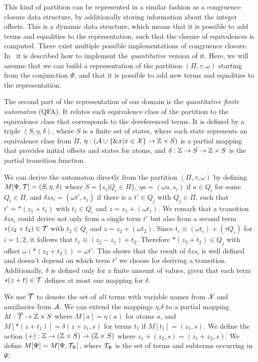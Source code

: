 This kind of partition can be represented in a similar fashion as a congruence closure data structure\cite{abstract-cc}, by additionally storing information about the integer offsets.
This is a dynamic data structure, which means that it is possible to add terms and equalities to the representation, such that the closure of equivalences is computed.
There exist multiple possible implementations of congruence closure\cite{cc-nelson, cc-shostak, cc-tarjan}.
In~\cite{2pointer} it is described how to implement the \emph{quantitative} version of it.
Here, we will assume that we can build a representation of the partition $(\Pi, \tau, \omega)$ starting from the conjunction $\Psi$, and that it is possible to add new terms and equalities to the representation.

The second part of the representation of our domain is the \emph{quantitative finite automaton} (QFA). It relates each equivalence class of the partition to the equivalence class that corresponds to the dereferenced terms.
It is defined by a triple $(S, \eta, \delta)$, where $S$ is a finite set of states, where each state represents an equivalence class from $\Pi$, $\eta : (\mathcal{A} \cup \{\&x | x \in \mathcal{X}\} \rightarrow \mathbb{Z} \times S)$ is a partial mapping that provides initial offsets and states for atoms, and $\delta : \mathbb{Z} \rightarrow S \rightarrow \mathbb{Z} \times S$ is the partial transition function.

We can derive the automaton directly from the partition $(\Pi, \tau, \omega)$ by defining $M[\Psi,\mathcal{T}] = (S, \eta, \delta)$ where $S = \{s_i | Q_i \in \Pi\}$, $\eta a = (\omega a, s_i)$ if $a \in Q_i$ for some $Q_i \in \Pi$, and $\delta z s_i = (\omega t', s_j)$ if there is a $t' \in Q_j$ with $Q_j \in \Pi$, such that $t' = *(z_1 + t_1)$ with $t_1 \in Q_i$ and $z = z_1 + (\omega t_1)$.
We remark that a transition $\delta z s_i$ could derive not only from a single term $t'$ but also from a second term $*(z_2 + t_2) \in \mathcal{T}$ with $t_2 \in Q_i$ and $z = z_2 + (\omega t_2)$.
Since $t_i \equiv (\omega t_i) + (\tau Q_i)$ for $i = 1,2$, it follows that $t_1 \equiv (z_2 - z_1)+ t_2$. Therefore $*(z_2+t_2)\in Q_j$ with offset $\omega(*(z_2+t_2)) = \omega t'$.
This shows that the result of $\delta z s_i$ is well defined and doesn't depend on which term $t'$ we choose for deriving a transition.
Additionally, $\delta$ is defined only for a finite amount of values, given that each term $*(z + t) \in \mathcal{T}$ defines at most one mapping for $\delta$.

We use ${\overline{\mathcal{T}}}$ to denote the set of \emph{all} terms with variable names from $\mathcal{X}$ and auxiliaries from $\mathcal{A}$.
We can extend the mappings $\eta$,$\delta$ to a partial mapping $M : {\overline{\mathcal{T}}} \rightarrow \mathbb{Z} \times S$ where $M[a] = \eta(a)$ for atoms $a$, and $M[*(z+t_1)] = \delta(z+z_1, s)$ for terms $t_1$ if $M[t_1] = (z_1,s)$.
We define the action $(+): \mathbb{Z} \rightarrow (\mathbb{Z} \times S) \rightarrow (\mathbb{Z} \times S)$ where $z_1 + (z_2,s) = (z_1 + z_2, s)$.
We define $M[\Psi] = M[\Psi,\mathcal{T}_\Psi]$, where $\mathcal{T}_\Psi$ is the set of terms and subterms occurring in $\Psi$.

